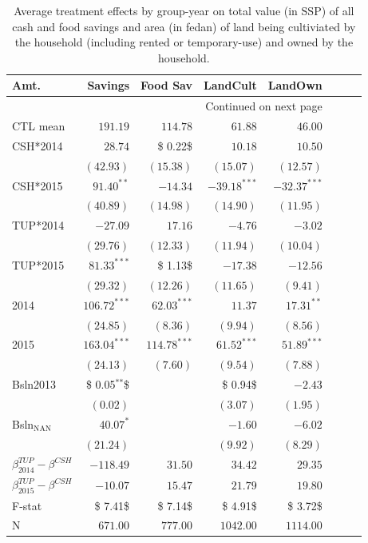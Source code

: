 \documentclass[12pt,article]{article}
\begin{document}
\begin{longtable}{lrrrrrrr}
\caption{\label{tab:Savings}Average treatment effects by group-year on total value (in SSP) of all cash and food savings and area (in fedan) of land being cultiviated by the household (including rented or temporary-use) and owned by the household.}
\\
\hline
Amt. & Savings & Food Sav & LandCult & LandOwn\\
\hline
\endhead
\hline\multicolumn{5}{r}{Continued on next page} \\
\endfoot
\endlastfoot
CTL mean & $191.19$ & $114.78$ & $61.88$ & $46.00$\\
\hline
CSH*2014 & $28.74$ & \$ 0.22\$ & $10.18$ & $10.50$\\
 & $(42.93)$ & $(15.38)$ & $(15.07)$ & $(12.57)$\\
CSH*2015 & $91.40^{**}$ & $-14.34$ & $-39.18^{***}$ & $-32.37^{***}$\\
 & $(40.89)$ & $(14.98)$ & $(14.90)$ & $(11.95)$\\
TUP*2014 & $-27.09$ & $17.16$ & $-4.76$ & $-3.02$\\
 & $(29.76)$ & $(12.33)$ & $(11.94)$ & $(10.04)$\\
TUP*2015 & $81.33^{***}$ & \$ 1.13\$ & $-17.38$ & $-12.56$\\
 & $(29.32)$ & $(12.26)$ & $(11.65)$ & $( 9.41)$\\
2014 & $106.72^{***}$ & $62.03^{***}$ & $11.37$ & $17.31^{**}$\\
 & $(24.85)$ & $( 8.36)$ & $( 9.94)$ & $( 8.56)$\\
2015 & $163.04^{***}$ & $114.78^{***}$ & $61.52^{***}$ & $51.89^{***}$\\
 & $(24.13)$ & $( 7.60)$ & $( 9.54)$ & $( 7.88)$\\
Bsln2013 & \$ 0.05$^{\text{**}}$\$ &  & \$ 0.94\$ & $-2.43$\\
 & $( 0.02)$ &  & $( 3.07)$ & $( 1.95)$\\
Bsln$_{\text{NAN}}$ & $40.07^{*}$ &  & $-1.60$ & $-6.02$\\
 & $(21.24)$ &  & $( 9.92)$ & $( 8.29)$\\
\hline
$\beta^{TUP}_{2014}-\beta^{CSH}$ & $-118.49$ & $31.50$ & $34.42$ & $29.35$\\
$\beta^{TUP}_{2015}-\beta^{CSH}$ & $-10.07$ & $15.47$ & $21.79$ & $19.80$\\
\hline
F-stat & \$ 7.41\$ & \$ 7.14\$ & \$ 4.91\$ & \$ 3.72\$\\
N & $671.00$ & $777.00$ & $1042.00$ & $1114.00$\\
\hline
\end{longtable}
\end{document}
